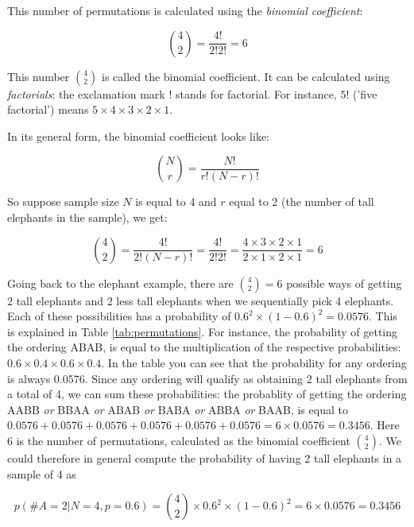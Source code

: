 This number of permutations is calculated using the \textit{binomial coefficient}:

\begin{equation}
 {4\choose 2} = \frac{4!}{2!2!} = 6
\end{equation}

This number ${4\choose 2}$ is called the binomial coefficient. It can be calculated using \textit{factorials}: the exclamation mark $!$ stands for factorial. For instance, $5!$ ('five factorial') means $5\times 4 \times 3 \times 2 \times 1$. 


In its general form, the binomial coefficient looks like:

\begin{equation}
 {N\choose r} = \frac{N!}{r!(N-r)!} 
\end{equation}

So suppose sample size $N$ is equal to 4 and $r$ equal to 2 (the number of tall elephants in the sample), we get:

\begin{equation}
{4\choose 2} = \frac{4!}{2!(N-r)!} = \frac{4!}{2!2!} =
\frac{4\times 3 \times 2 \times 1}{2 \times 1 \times  2 \times 1} = 6
\end{equation} 

Going back to the elephant example, there are ${4\choose 2}=6$ possible ways of getting 2 tall elephants and 2 less tall elephants when we sequentially pick 4 elephants. Each of these possibilities has a probability of $0.6^2 \times (1-0.6)^2 = 0.0576$. This is explained in Table \ref{tab:permutations}. For instance, the probability of getting the ordering ABAB, is equal to the multiplication of the respective probabilities: $0.6 \times 0.4 \times 0.6 \times 0.4$. In the table you can see that the probability for any ordering is always 0.0576. Since any ordering will qualify as obtaining 2 tall elephants from a total of 4, we can sum these probabilities: the probablity of getting the ordering AABB \textit{or} BBAA \textit{or} ABAB \textit{or} BABA \textit{or} ABBA \textit{or} BAAB, is equal to $0.0576 + 0.0576 + 0.0576 + 0.0576 + 0.0576 + 0.0576 = 6 \times 0.0576 = 0.3456 $. Here 6 is the number of permutations, calculated as the binomial coefficient ${4\choose 2}$. We could therefore in general compute the probability of having 2 tall elephants in a sample of 4 as

\begin{equation}
 p(\#A = 2 | N = 4, p = 0.6) = {4\choose 2} \times 0.6^2 \times (1-0.6)^2 = 6 \times 0.0576 =
 0.3456
\end{equation}


